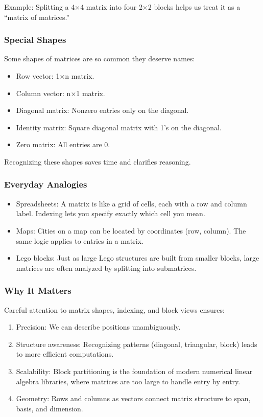 \documentclass[
  letterpaper,
  DIV=11,
  numbers=noendperiod]{scrreprt}
\providecommand{\tightlist}{%
  \setlength{\itemsep}{0pt}\setlength{\parskip}{0pt}}
\begin{document}
Example: Splitting a 4×4 matrix into four 2×2 blocks helps us treat it
as a ``matrix of matrices.''

\subsubsection{Special Shapes}\label{special-shapes}

Some shapes of matrices are so common they deserve names:

\begin{itemize}
\tightlist
\item
  Row vector: 1×n matrix.
\item
  Column vector: n×1 matrix.
\item
  Diagonal matrix: Nonzero entries only on the diagonal.
\item
  Identity matrix: Square diagonal matrix with 1's on the diagonal.
\item
  Zero matrix: All entries are 0.
\end{itemize}

Recognizing these shapes saves time and clarifies reasoning.

\subsubsection{Everyday Analogies}\label{everyday-analogies-8}

\begin{itemize}
\tightlist
\item
  Spreadsheets: A matrix is like a grid of cells, each with a row and
  column label. Indexing lets you specify exactly which cell you mean.
\item
  Maps: Cities on a map can be located by coordinates (row, column). The
  same logic applies to entries in a matrix.
\item
  Lego blocks: Just as large Lego structures are built from smaller
  blocks, large matrices are often analyzed by splitting into
  submatrices.
\end{itemize}

\subsubsection{Why It Matters}\label{why-it-matters-8}

Careful attention to matrix shapes, indexing, and block views ensures:

\begin{enumerate}
\def\labelenumi{\arabic{enumi}.}
\tightlist
\item
  Precision: We can describe positions unambiguously.
\item
  Structure awareness: Recognizing patterns (diagonal, triangular,
  block) leads to more efficient computations.
\item
  Scalability: Block partitioning is the foundation of modern numerical
  linear algebra libraries, where matrices are too large to handle entry
  by entry.
\item
  Geometry: Rows and columns as vectors connect matrix structure to
  span, basis, and dimension.
\end{enumerate}
\end{document}
